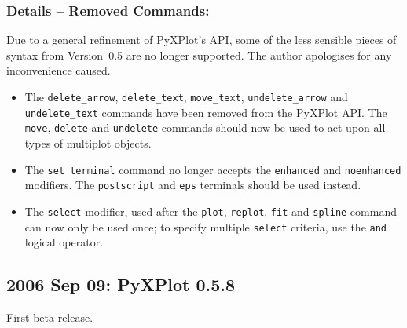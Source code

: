\subsubsection*{Details -- Removed Commands:}

Due to a general refinement of PyXPlot's API, some of the less sensible pieces
of syntax from Version~0.5 are no longer supported. The author apologises for
any inconvenience caused.

\begin{itemize}
\item The {\tt delete\_arrow}, {\tt delete\_text}, {\tt move\_text}, {\tt undelete\_arrow} and {\tt undelete\_text} commands have been removed from the PyXPlot API. The {\tt move}, {\tt delete} and {\tt undelete} commands should now be used to act upon all types of multiplot objects.
\item The {\tt set terminal} command no longer accepts the {\tt enhanced} and {\tt noenhanced} modifiers. The {\tt postscript} and {\tt eps} terminals should be used instead.
\item The {\tt select} modifier, used after the {\tt plot}, {\tt replot}, {\tt fit} and {\tt spline} command can now only be used once; to specify multiple {\tt select} criteria, use the {\tt and} logical operator.
\end{itemize}

\subsection*{2006 Sep 09: PyXPlot 0.5.8}

First beta-release.
